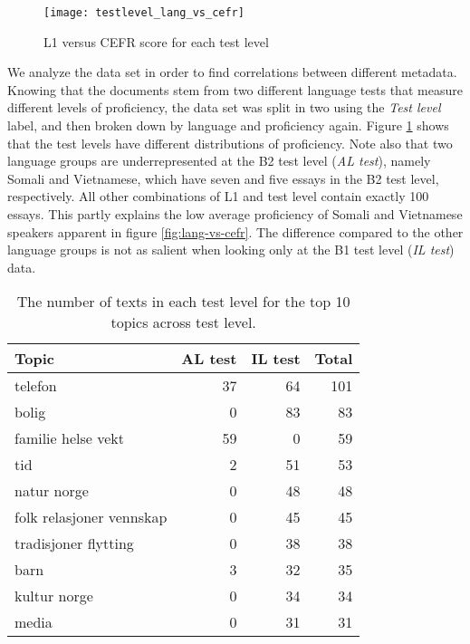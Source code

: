 \begin{figure}
  \centering
  \texttt{[image: testlevel\_lang\_vs\_cefr]}
  \caption{L1 versus CEFR score for each test level}
  \label{fig:testlevel-lang-vs-cefr}
\end{figure}

We analyze the data set in order to find correlations between different
metadata. Knowing that the documents stem from two different language tests
that measure different levels of proficiency, the data set was split in two
using the \emph{Test level} label, and then broken down by language and
proficiency again. Figure \ref{fig:testlevel-lang-vs-cefr} shows that the
test levels have different distributions of proficiency. Note also that two
language groups are underrepresented at the B2 test level (\emph{AL test}),
namely Somali and Vietnamese, which have seven and five essays in the B2 test
level, respectively. All other combinations of L1 and test level contain
exactly 100 essays. This partly explains the low average proficiency of
Somali and Vietnamese speakers apparent in figure \ref{fig:lang-vs-cefr}. The
difference compared to the other language groups is not as salient when
looking only at the B1 test level (\emph{IL test}) data.

\begin{table}
  \centering
  \begin{tabular}{lrrr}
    \toprule
    Topic                    & AL test & IL test & Total \\
    \midrule
    telefon                  &      37 &      64 &   101 \\
    bolig                    &       0 &      83 &    83 \\
    familie helse vekt       &      59 &       0 &    59 \\
    tid                      &       2 &      51 &    53 \\
    natur norge              &       0 &      48 &    48 \\
    folk relasjoner vennskap &       0 &      45 &    45 \\
    tradisjoner flytting     &       0 &      38 &    38 \\
    barn                     &       3 &      32 &    35 \\
    kultur norge             &       0 &      34 &    34 \\
    media                    &       0 &      31 &    31 \\
    \bottomrule
  \end{tabular}
  \caption[Most common topics in ASK texts]{
    The number of texts in each test level for the top 10 topics
    across test level.
  }
  \label{tab:texts-per-topic}
\end{table}

